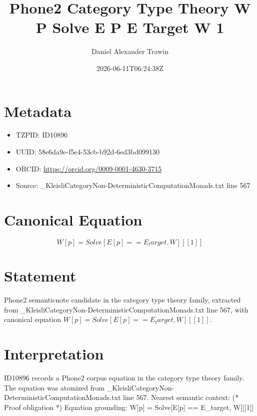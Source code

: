 \documentclass[11pt]{article}
\title{Phone2 Category Type Theory W P Solve E P E Target W 1}
\author{Daniel Alexander Trawin}
\date{2026-06-11T06:24:38Z}
\begin{document}
\maketitle
\section*{Metadata}
\begin{itemize}
\item TZPID: ID10896
\item UUID: 58e6da9e-f5e4-53cb-b92d-6ed3bd099130
\item ORCID: \url{https://orcid.org/0009-0001-4630-3715}
\item Source: _KleisliCategoryNon-DeterministicComputationMonads.txt line 567
\end{itemize}
\section*{Canonical Equation}
\[
W[p] = Solve[E[p] == E_target, W][[1]]
\]
\section*{Statement}
Phone2 semanticnote candidate in the category type theory family, extracted from _KleisliCategoryNon-DeterministicComputationMonads.txt line 567, with canonical equation $W[p] = Solve[E[p] == E_target, W][[1]]$.
\section*{Interpretation}
ID10896 records a Phone2 corpus equation in the category type theory family. The equation was atomized from _KleisliCategoryNon-DeterministicComputationMonads.txt line 567. Nearest semantic context: (* Proof obligation *) Equation grounding: W[p] = Solve[E[p] == E_target, W][[1]]
\end{document}
